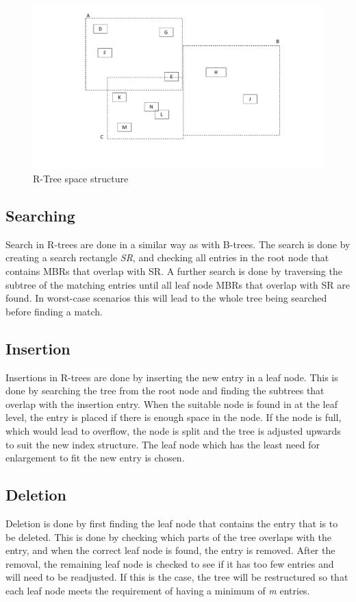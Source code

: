 \begin{figure}[ht]
    \centering
    \includegraphics[scale=0.3]{figures/r-tree_space.pdf}
    \caption{R-Tree space structure}
    \label{fig:RtreeSpace}
\end{figure}

\subsection{Searching}
Search in R-trees are done in a similar way as with B-trees. The search is done by creating a search rectangle \emph{SR}, and checking all entries in the root node that contains MBRs that overlap with SR. A further search is done by traversing the subtree of the matching entries until all leaf node MBRs that overlap with SR are found. In worst-case scenarios this will lead to the whole tree being searched before finding a match. 

\subsection{Insertion}
Insertions in R-trees are done by inserting the new entry in a leaf node. This is done by searching the tree from the root node and finding the subtrees that overlap with the insertion entry. When the suitable node is found in at the leaf level, the entry is placed if there is enough space in the node. If the node is full, which would lead to overflow, the node is split and the tree is adjusted upwards to suit the new index structure. The leaf node which has the least need for enlargement to fit the new entry is chosen.

\subsection{Deletion}
Deletion is done by first finding the leaf node that contains the entry that is to be deleted. This is done by checking which parts of the tree overlaps with the entry, and when the correct leaf node is found, the entry is removed. After the removal, the remaining leaf node is checked to see if it has too few entries and will need to be readjusted. If this is the case, the tree will be restructured so that each leaf node meets the requirement of having a minimum of \emph{m} entries. 

